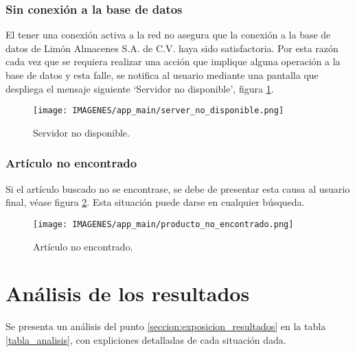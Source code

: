 \subsubsection{Sin conexión a la base de datos}
El tener una conexión activa a la red no asegura que la conexión a la base de datos de Limón Almacenes S.A. de C.V. haya sido satisfactoria. Por esta razón cada vez que se requiera realizar una acción que implique alguna operación a la base de datos y esta falle, se notifica al usuario mediante una pantalla que despliega el mensaje siguiente `Servidor no disponible', figura \ref{fracaso_servidor_nodisponible}.

\begin{figure}[!h]
	\centering
	\texttt{[image: IMAGENES/app\_main/server\_no\_disponible.png]}
	\caption{Servidor no disponible.}
	\label{fracaso_servidor_nodisponible}
\end{figure}

\subsubsection{Artículo no encontrado}
Si el artículo buscado no se encontrase, se debe de presentar esta causa al usuario final, véase figura \ref{fracaso_articulo_noencontrado}. Esta situación puede darse en cualquier búsqueda.

\begin{figure}[!h]
	\centering
	\texttt{[image: IMAGENES/app\_main/producto\_no\_encontrado.png]}
	\caption{Artículo no encontrado.}
	\label{fracaso_articulo_noencontrado}
\end{figure}

\section{Análisis de los resultados}
Se presenta un análisis del punto \ref{seccion:exposicion_resultados} en la tabla \ref{tabla_analisis}, con expliciones detalladas de cada situación dada.

